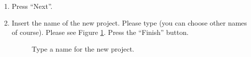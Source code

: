 \begin{enumerate}
\item
  Press ``Next''.

\item
  Insert the name of the new project. Please type 
  (you can choose other names of course). Please see Figure
  \ref{fig:projectname}. Press the ``Finish'' button.
%
\begin{figure}[htb]
\caption{Type a name for the new project.}
\label{fig:projectname}
\end{figure}




\end{enumerate}
